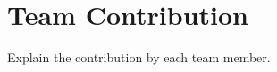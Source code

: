 
\section{Team Contribution}
\label{sec:contribution}
Explain the contribution by each team member.
